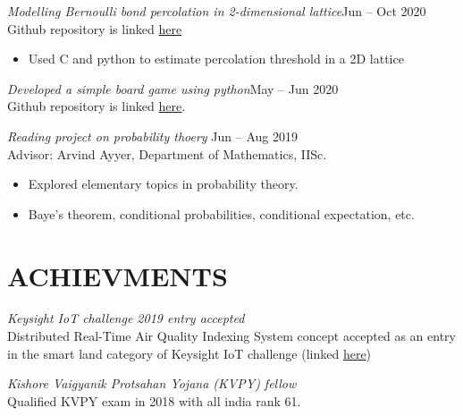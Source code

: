 \documentclass[margin, 10pt]{res} %
\newenvironment{changemargin}[2]{%
\begin{list}{}{%
\setlength{\topsep}{0pt}%
\setlength{\leftmargin}{#1}%
\setlength{\rightmargin}{#2}%
\setlength{\listparindent}{\parindent}%
\setlength{\itemindent}{\parindent}%
\setlength{\parsep}{\parskip}%
}%
\item[]}{\end{list}}
\begin{document}
\begin{resume}
\bigskip

{\sl Modelling Bernoulli bond percolation in 2-dimensional lattice}\hfill Jun -- Oct 2020\\
Github repository is linked
\href{https://github.com/AbhinavM2000/percolation\_}{here}
\begin{changemargin}{0pt}{80pt}
\begin{itemize}
	\item Used C and python to estimate percolation threshold in a 2D lattice
\end{itemize}
\end{changemargin}

\bigskip

{\sl Developed a simple board game using python}\hfill May -- Jun 2020\\
Github repository is linked
\href{https://github.com/DhanusML/marble-and-hole-puzzle}{here}.

\bigskip

{\sl Reading project on probability thoery} \hfill Jun -- Aug 2019 \\
Advisor: Arvind Ayyer, Department of Mathematics, IISc.
\begin{changemargin}{0pt}{80pt}
\begin{itemize} \itemsep -2pt %
	\item Explored elementary topics in probability theory.
	\item Baye's theorem, conditional probabilities,
		conditional expectation, etc.
\end{itemize}
\end{changemargin}




\section{ACHIEVMENTS}

{\sl Keysight IoT challenge 2019 entry accepted}\\
Distributed Real-Time Air Quality Indexing System concept accepted
as an entry in the smart land category of Keysight IoT challenge
(linked \href{https://www.iotchallengekeysight.com/2019/entries/smart-land/41-0413-102730-draqis-distributed-real-time-air-quality-indexing-system}{here})

{\sl Kishore Vaigyanik Protsahan Yojana (KVPY) fellow}\\
Qualified KVPY exam in 2018 with all india rank 61.





\end{resume}
\end{document}

